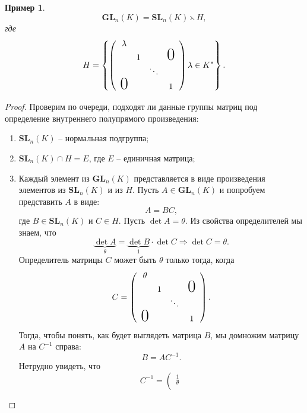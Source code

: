 \documentclass{article}
\newtheorem{example}{Пример}[section]
\begin{document}
\begin{example}
    $$ \mathbf{GL}_n(K) = \mathbf{SL}_n(K) \leftthreetimes H,$$ где
    \[
        H = \left\{
        \left(
            \begin{array}{ccccc}
             \lambda                              \\
              & 1             &   & \text{\huge0}\\
              &  & \ddots            \\
              \text{\huge0} &  &  & 1
            \end{array}
        \right)
        \lambda \in K^*
        \right\}.
    \]
\end{example}
\begin{proof}
    Проверим по очереди, подходят ли данные группы матриц под определение внутреннего полупрямого произведения:
    \begin{enumerate}
        \item $\mathbf{SL}_n(K)$ -- нормальная подгруппа;
        \item $\mathbf{SL}_n(K) \cap H = E$, где $E$ -- единичная матрица;
        \item Каждый элемент из $\mathbf{GL}_n(K)$ представляется в виде произведения элементов из $\mathbf{SL}_n(K)$ и из $H$.
        Пусть $A \in \mathbf{GL}_n(K)$ и попробуем представить $A$ в виде: $$A = B C, $$ где $B \in \mathbf{SL}_n(K)$ и $C \in H$.
        Пусть $\det A = \theta$. Из свойства определителей мы знаем, что $$ \underbrace{\det A}_{\theta} = \underbrace{\det B}_{1} \cdot \det C \Rightarrow \det C = \theta. $$
        Определитель матрицы $C$ может быть $\theta$ только тогда, когда
        \[
            C = 
            \left(
                \begin{array}{ccccc}
                 \theta                              \\
                  & 1             &   & \text{\huge0}\\
                  &  & \ddots            \\
                  \text{\huge0} &  &  & 1
                \end{array}
            \right).
        \]
        Тогда, чтобы понять, как будет выглядеть матрица $B$, мы домножим матрицу $A$ на $C^{-1}$ справа: $$ B = A C^{-1}. $$
        Нетрудно увидеть, что
        \[
            C^{-1} = 
            \left(
                \begin{array}{ccccc}
                 \frac{1}{\theta}                   \\

\end{array}\]
\end{enumerate}
\end{proof}
\end{document}
